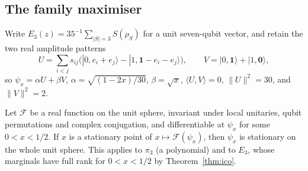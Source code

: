 \subsection{The family maximiser}
\label{sec:entropy-local-seven}

Write \(E_3(z)=35^{-1}\sum_{|S|=3}S(\rho_S)\) for a unit
seven-qubit vector, and retain the two real amplitude patterns
\[
 U=\sum_{i<j}s_{ij}\bigl(|0,e_i+e_j\rangle
       -|1,\mathbf1-e_i-e_j\rangle\bigr),\qquad
 V=|0,\mathbf1\rangle+|1,\mathbf0\rangle,
\]
so \(\psi_x=\alpha U+\beta V\), \(\alpha=\sqrt{(1-2x)/30}\), \(\beta=\sqrt x\),
\(\langle U,V\rangle=0\), \(\|U\|^2=30\), and \(\|V\|^2=2\).

\begin{lemma}
\label{lem:seven-family-symmetric-criticality}
Let $\mathcal F$ be a real function on the unit sphere, invariant under
local unitaries, qubit permutations and complex conjugation, and
differentiable at $\psi_x$ for some $0<x<1/2$. If $x$ is a stationary point
of $x\mapsto\mathcal F(\psi_x)$, then $\psi_x$ is stationary on the whole
unit sphere. This applies to $\pi_3$ (a polynomial) and to $E_3$, whose
marginals have full rank for $0<x<1/2$ by Theorem~\ref{thm:ico}.
\end{lemma}
